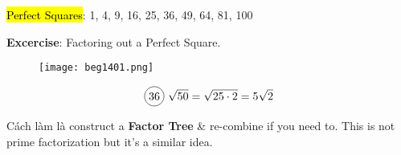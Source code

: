 \hl{Perfect Squares}: 1, 4, 9, 16, 25, 36, 49, 64, 81, 100

\vspace{.4cm}

\textbf{Excercise}: Factoring out a Perfect Square.

\begin{figure}[htb!]
  \centering
  \texttt{[image: beg1401.png]}
\end{figure}

\[\circled{36}\ \sqrt{50}=\sqrt{25 \cdot 2}=5\sqrt{2}\]

Cách làm là construct a \textbf{Factor Tree} \& re-combine if you need to. This is not prime factorization but it's a similar idea.

\vspace{.4cm}

